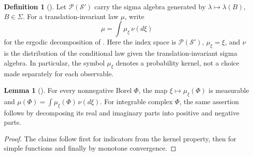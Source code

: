 \documentclass[11pt,letterpaper,reqno]{amsart}
\theoremstyle{definition}
\newtheorem{qcmlemma}[qcmproposition]{Lemma}
\newtheorem{qcmdefinition}[qcmproposition]{Definition}
\newenvironment{lemma}[1][]{\pushQED{\qed}\renewcommand{\qedsymbol}{$\blacksquare$}\begin{qcmlemma}[#1]}{\popQED\end{qcmlemma}}
\newenvironment{definition}[1][]{\pushQED{\qed}\renewcommand{\qedsymbol}{$\blacksquare$}\begin{qcmdefinition}[#1]}{\popQED\end{qcmdefinition}}
\begin{document}
\begin{definition}\label{qcm:component-notation}
Let $\mathcal P(\mathcal S')$ carry the sigma algebra generated by
$\lambda\mapsto\lambda(B)$, $B\in\Sigma$.
For a translation-invariant law $\mu$, write
\[
 \mu=\int\mu_\xi\,\nu(d\xi)
\]
for the ergodic decomposition of
\cite[Theorem~A and Sections~5--7]{ErgodicComponents}.
Here the index space is $\mathcal P(\mathcal S')$,
$\mu_\xi=\xi$, and $\nu$ is the distribution of the conditional
law given the translation-invariant sigma algebra. In particular, the symbol
$\mu_\xi$ denotes a probability kernel, not a choice made
separately for each observable.
\end{definition}
\begin{lemma}\label{qcm:component-measurability}
For every nonnegative Borel $\Phi$, the map
$\xi\mapsto\mu_\xi(\Phi)$ is measurable and
$\mu(\Phi)=\int\mu_\xi(\Phi)\,\nu(d\xi)$.
For integrable complex $\Phi$, the same assertion follows by
decomposing its real and imaginary parts into positive and
negative parts.
\end{lemma}
\begin{proof}
The claims follow first for indicators from
the kernel property, then for simple functions and finally by
monotone convergence.
\end{proof}
\end{document}

